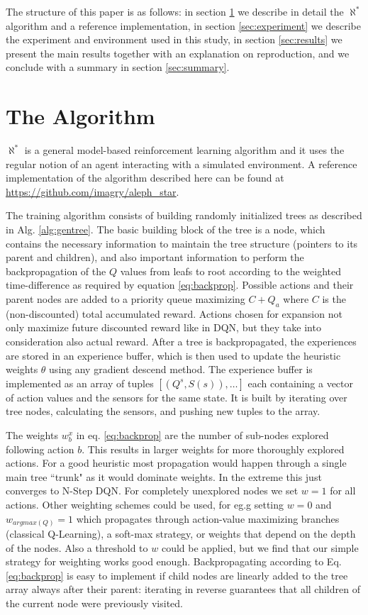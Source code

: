 \documentclass{article}
\newcommand{\alephstar}{$\aleph^*$ }
\begin{document}
The structure of this paper is as follows: in section \ref{sec:algorithm} we describe in detail the \alephstar algorithm and a reference implementation, in section \ref{sec:experiment} we describe the experiment and environment used in this study, in section \ref{sec:results} we present the main results together with an explanation on reproduction, and we conclude with a summary in section \ref{sec:summary}. 

\section{The Algorithm}
\label{sec:algorithm}

\alephstar is a general model-based reinforcement learning algorithm and it uses the regular notion of an agent interacting with a simulated environment. A reference implementation of the algorithm described here can be found at \url{https://github.com/imagry/aleph_star}.

The training algorithm consists of building randomly initialized trees as described in Alg. \ref{alg:gentree}. The basic building block of the tree is a node, which contains the necessary information to maintain the tree structure (pointers to its parent and children), and also important information to perform the backpropagation of the $Q$ values from leafs to root according to the weighted time-difference as required by equation \ref{eq:backprop}. Possible actions and their parent nodes are added to a priority queue maximizing $C+Q_a$ where $C$ is the (non-discounted) total accumulated reward. Actions chosen for expansion not only maximize future discounted reward like in DQN, but they take into consideration also actual reward. After a tree is backpropagated, the experiences are stored in an experience buffer, which is then used to update the heuristic weights $\theta$ using any gradient descend method. The experience buffer is implemented as an array of tuples $[(Q^s, S(s)), \ldots]$ each containing a vector of action values and the sensors for the same state. It is built by iterating over tree nodes, calculating the sensors, and pushing new tuples to the array.

The weights $w^x_b$ in eq. \ref{eq:backprop} are the number of sub-nodes explored following action $b$. This results in larger weights for more thoroughly explored actions. For a good heuristic most propagation would happen through a single main tree ``trunk" as it would dominate weights. In the extreme this just converges to N-Step DQN. For completely unexplored nodes we set $w=1$ for all actions. Other weighting schemes could be used, for eg.g setting $w=0$ and $w_{argmax(Q)}=1$ which propagates through action-value maximizing branches (classical Q-Learning), a soft-max strategy, or weights that depend on the depth of the nodes. Also a threshold to $w$ could be applied, but we find that our simple strategy for weighting works good enough. Backpropagating according to Eq. \ref{eq:backprop} is easy to implement if child nodes are linearly added to the tree array always after their parent: iterating in reverse guarantees that all children of the current node were previously visited.
\end{document}

